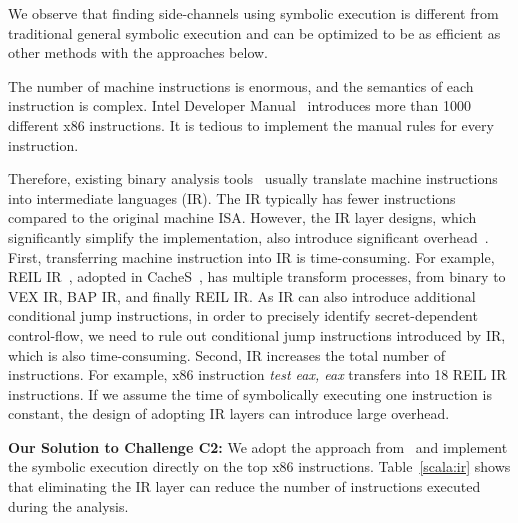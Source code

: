 We observe that finding side-channels using symbolic execution is different from 
traditional general symbolic execution and can be optimized to be as efficient as other
methods with the approaches  below.


The number of machine instructions is enormous, and the semantics of each instruction is complex. 
Intel Developer Manual~\cite{intelsys}
introduces more than 1000 different x86 instructions. 
It is tedious to implement the manual 
rules for every instruction.

Therefore, existing binary analysis tools~\cite{shoshitaishvili2016state, 10.1007/978-3-642-22110-1_37} 
usually translate machine instructions into intermediate languages (IR). 
The IR typically has fewer instructions compared to the original machine ISA\@. 
However, the IR layer designs, which significantly
simplify the implementation, also introduce significant overhead~\cite{217563}.
First, transferring machine
instruction into IR is time-consuming.
For example, REIL IR~\cite{dullien2009reil}, adopted in
CacheS~\cite{236338}, has multiple transform processes, from binary to VEX IR, BAP IR,
and finally REIL IR\@. 
As IR can also introduce additional conditional jump instructions,
in order to precisely identify secret-dependent control-flow,
we need to rule out conditional jump instructions introduced by
IR, which is also time-consuming. Second, IR increases the total
number of instructions. For example, x86 instruction \textit{test eax, eax} 
transfers into 18 REIL IR instructions. If we assume the time of symbolically executing 
one instruction is constant, the design of adopting IR layers can introduce large overhead. 

\vspace*{2pt}
\textbf{Our Solution to Challenge C2:}
We adopt the approach from~\cite{217563} and implement the symbolic execution 
directly on the top x86 instructions. Table~\ref{scala:ir} 
 shows that eliminating the IR layer can reduce the number
of instructions executed during the analysis.

